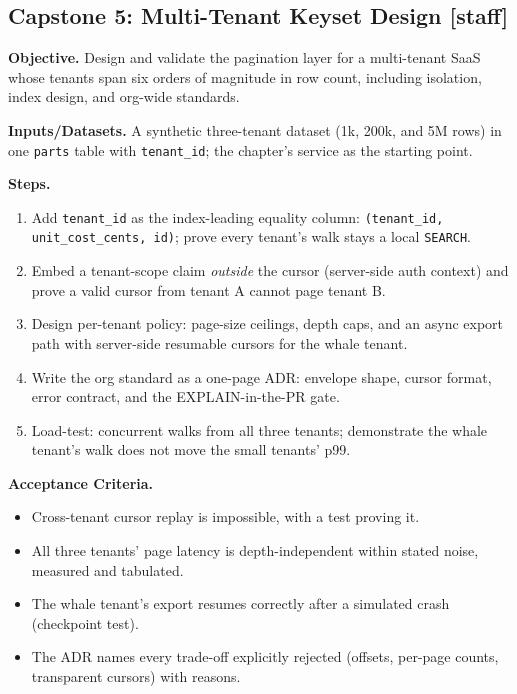 \subsection{Capstone 5: Multi-Tenant Keyset Design [staff]}

\textbf{Objective.} Design and validate the pagination layer for a
multi-tenant SaaS whose tenants span six orders of magnitude in row count,
including isolation, index design, and org-wide standards.

\textbf{Inputs/Datasets.} A synthetic three-tenant dataset (1k, 200k, and
5M rows) in one \texttt{parts} table with \texttt{tenant\_id}; the
chapter's service as the starting point.

\textbf{Steps.}
\begin{enumerate}
  \item Add \texttt{tenant\_id} as the index-leading equality column:
        \texttt{(tenant\_id, unit\_cost\_cents, id)}; prove every tenant's
        walk stays a local \texttt{SEARCH}.
  \item Embed a tenant-scope claim \emph{outside} the cursor (server-side
        auth context) and prove a valid cursor from tenant A cannot page
        tenant B.
  \item Design per-tenant policy: page-size ceilings, depth caps, and an
        async export path with server-side resumable cursors for the whale
        tenant.
  \item Write the org standard as a one-page ADR: envelope shape, cursor
        format, error contract, and the EXPLAIN-in-the-PR gate.
  \item Load-test: concurrent walks from all three tenants; demonstrate
        the whale tenant's walk does not move the small tenants' p99.
\end{enumerate}

\textbf{Acceptance Criteria.}
\begin{itemize}
  \item[$\square$] Cross-tenant cursor replay is impossible, with a test
        proving it.
  \item[$\square$] All three tenants' page latency is depth-independent
        within stated noise, measured and tabulated.
  \item[$\square$] The whale tenant's export resumes correctly after a
        simulated crash (checkpoint test).
  \item[$\square$] The ADR names every trade-off explicitly rejected
        (offsets, per-page counts, transparent cursors) with reasons.
\end{itemize}


